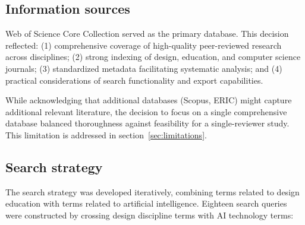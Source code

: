 \documentclass[ed]{acnsart}
\begin{document}
\subsection{Information sources}

Web of Science Core Collection served as the primary database. This decision reflected: (1) comprehensive coverage of high-quality peer-reviewed research across disciplines; (2) strong indexing of design, education, and computer science journals; (3) standardized metadata facilitating systematic analysis; and (4) practical considerations of search functionality and export capabilities.

While acknowledging that additional databases (Scopus, ERIC) might capture additional relevant literature, the decision to focus on a single comprehensive database balanced thoroughness against feasibility for a single-reviewer study. This limitation is addressed in section~\ref{sec:limitations}.

\subsection{Search strategy}

The search strategy was developed iteratively, combining terms related to design education with terms related to artificial intelligence. Eighteen search queries were constructed by crossing design discipline terms with AI technology terms:
%
%
\end{document}

